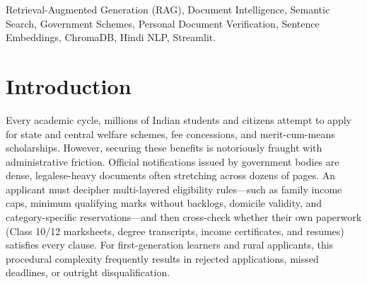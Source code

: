 \documentclass[conference]{IEEEtran}
\begin{document}
\begin{abstract}
We benchmark the retrieval pipeline against a controlled test set of synthetic citizen credentials and 20 parallel bilingual queries. Empirical results demonstrate that local dense embeddings achieve a perfect 1.00 Hit@1 and 1.00 MRR on English scheme retrieval, maintaining complete immunity to cross-index keyword interference (0.93 MRR) at a responsive 35\,ms median retrieval latency on commodity CPU. However, we document a severe performance drop on Hindi queries (0.20 Hit@1 vs. 0.45 for lexical hashing), tracing this limitation directly to Devanagari subword token fragmentation in English-centric transformers. Finally, we provide battle-tested engineering solutions for key production challenges, including silent embedding failure modes, non-reproducible hash collisions, restart indexing bloat, and API credential leakage.
\end{abstract}

\begin{IEEEkeywords}
Retrieval-Augmented Generation (RAG), Document Intelligence, Semantic Search, Government Schemes, Personal Document Verification, Sentence Embeddings, ChromaDB, Hindi NLP, Streamlit.
\end{IEEEkeywords}

\section{Introduction}
Every academic cycle, millions of Indian students and citizens attempt to apply for state and central welfare schemes, fee concessions, and merit-cum-means scholarships. However, securing these benefits is notoriously fraught with administrative friction. Official notifications issued by government bodies are dense, legalese-heavy documents often stretching across dozens of pages. An applicant must decipher multi-layered eligibility rules---such as family income caps, minimum qualifying marks without backlogs, domicile validity, and category-specific reservations---and then cross-check whether their own paperwork (Class 10/12 marksheets, degree transcripts, income certificates, and resumes) satisfies every clause. For first-generation learners and rural applicants, this procedural complexity frequently results in rejected applications, missed deadlines, or outright disqualification.
\end{document}
